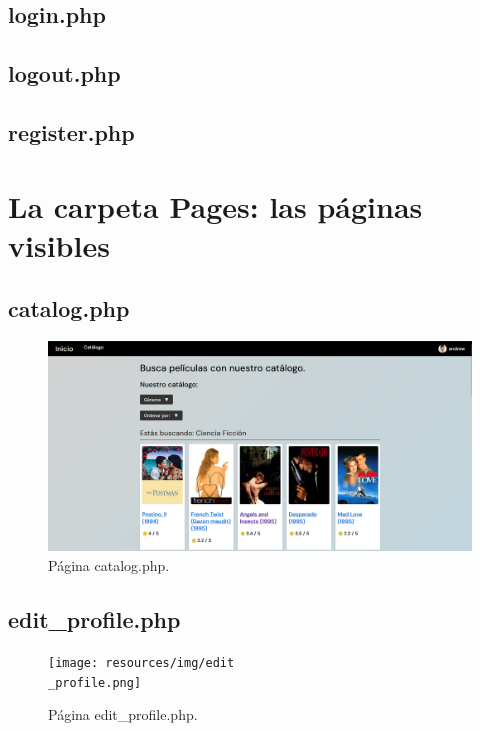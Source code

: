 \documentclass[a4paper, 12pt]{report}
\begin{document}
    \section{login.php}
    \section{logout.php}
    \section{register.php}

    \chapter{La carpeta Pages: las páginas visibles}
    \section{catalog.php}
    \begin{figure}[H]
        \centering
        \includegraphics[scale=0.20]{resources/img/catalog.png}
        \caption{Página catalog.php.}
        \label{fig:catalog}
    \end{figure}
    \section{edit\_profile.php}
    \begin{figure}[H]
        \centering
        \texttt{[image: resources/img/edit\\\_profile.png]}
        \caption{Página edit\_profile.php.}
        \label{fig:edit}
    \end{figure}
\end{document}
